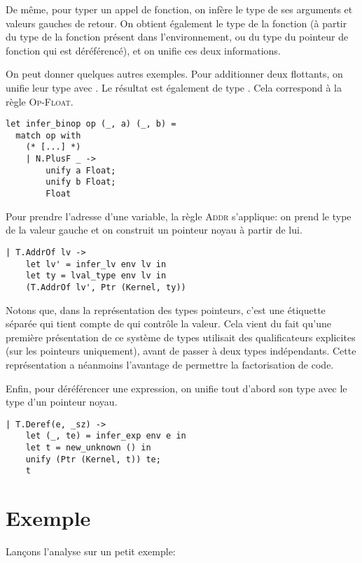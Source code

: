 De même, pour typer un appel de fonction, on infère le type de ses arguments et
valeurs gauches de retour. On obtient également le type de la fonction (à partir
du type de la fonction présent dans l'environnement, ou du type du pointeur de
fonction qui est déréférencé), et on unifie ces deux informations.

On peut donner quelques autres exemples. Pour additionner deux flottants, on
unifie leur type avec \tFloat. Le résultat est également de type \tFloat. Cela
correspond à la règle \textsc{Op-Float}.

\begin{verbatim}
let infer_binop op (_, a) (_, b) =
  match op with
    (* [...] *)
    | N.PlusF _ ->
        unify a Float;
        unify b Float;
        Float
\end{verbatim}

Pour prendre l'adresse d'une variable, la règle \textsc{Addr} s'applique: on
prend le type de la valeur gauche et on construit un pointeur noyau à partir de
lui.

\begin{verbatim}
| T.AddrOf lv ->
    let lv' = infer_lv env lv in
    let ty = lval_type env lv in
    (T.AddrOf lv', Ptr (Kernel, ty))
\end{verbatim}

\label{page:qualifs-pas-qualifs}
Notons que, dans la représentation des types pointeurs, c'est une étiquette
séparée qui tient compte de qui contrôle la valeur. Cela vient du fait qu'une
première présentation de ce système de types utilisait des qualificateurs
explicites (sur les pointeurs uniquement), avant de passer à deux types
indépendants. Cette représentation a néanmoins l'avantage de permettre la
factorisation de code.


Enfin, pour déréférencer une expression, on unifie tout d'abord son type avec le
type d'un pointeur noyau.

\begin{verbatim}
| T.Deref(e, _sz) ->
    let (_, te) = infer_exp env e in
    let t = new_unknown () in
    unify (Ptr (Kernel, t)) te;
    t
\end{verbatim}

\section{Exemple}

Lançons l'analyse sur un petit exemple:

